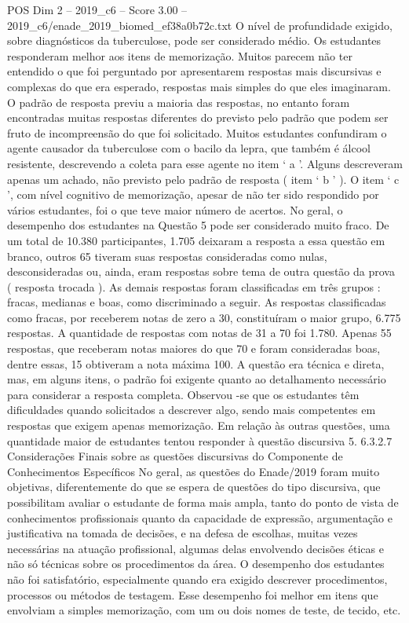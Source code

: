 \begin{textsample}{POS Dim 2 – 2019\_c6 – Score 3.00 – 2019\_c6/enade\_2019\_biomed\_ef38a0b72c.txt}
O nível de profundidade exigido, sobre diagnósticos da tuberculose, pode ser considerado médio.
Os estudantes responderam melhor aos itens de memorização.
Muitos parecem não ter entendido o que foi perguntado por apresentarem respostas mais discursivas e complexas do que era esperado, respostas mais simples do que eles imaginaram.
O padrão de resposta previu a maioria das respostas, no entanto foram encontradas muitas respostas diferentes do previsto pelo padrão que podem ser fruto de incompreensão do que foi solicitado.
Muitos estudantes confundiram o agente causador da tuberculose com o bacilo da lepra, que também é álcool resistente, descrevendo a coleta para esse agente no item ‘ a ’.
Alguns descreveram apenas um achado, não previsto pelo padrão de resposta ( item ‘ b ’ ).
O item ‘ c ’, com nível cognitivo de memorização, apesar de não ter sido respondido por vários estudantes, foi o que teve maior número de acertos.
No geral, o desempenho dos estudantes na Questão 5 pode ser considerado muito fraco.
De um total de 10.380 participantes, 1.705 deixaram a resposta a essa questão em branco, outros 65 tiveram suas respostas consideradas como nulas, desconsideradas ou, ainda, eram respostas sobre tema de outra questão da prova ( resposta trocada ).
As demais respostas foram classificadas em três grupos : fracas, medianas e boas, como discriminado a seguir.
As respostas classificadas como fracas, por receberem notas de zero a 30, constituíram o maior grupo, 6.775 respostas.
A quantidade de respostas com notas de 31 a 70 foi 1.780.
Apenas 55 respostas, que receberam notas maiores do que 70 e foram consideradas boas, dentre essas, 15 obtiveram a nota máxima 100.
A questão era técnica e direta, mas, em alguns itens, o padrão foi exigente quanto ao detalhamento necessário para considerar a resposta completa.
Observou -se que os estudantes têm dificuldades quando solicitados a descrever algo, sendo mais competentes em respostas que exigem apenas memorização.
Em relação às outras questões, uma quantidade maior de estudantes tentou responder à questão discursiva 5. 6.3.2.7 Considerações Finais sobre as questões discursivas do Componente de Conhecimentos Específicos No geral, as questões do Enade/2019 foram muito objetivas, diferentemente do que se espera de questões do tipo discursiva, que possibilitam avaliar o estudante de forma mais ampla, tanto do ponto de vista de conhecimentos profissionais quanto da capacidade de expressão, argumentação e justificativa na tomada de decisões, e na defesa de escolhas, muitas vezes necessárias na atuação profissional, algumas delas envolvendo decisões éticas e não só técnicas sobre os procedimentos da área.
O desempenho dos estudantes não foi satisfatório, especialmente quando era exigido descrever procedimentos, processos ou métodos de testagem.
Esse desempenho foi melhor em itens que envolviam a simples memorização, com um ou dois nomes de teste, de tecido, etc.

\end{textsample}
